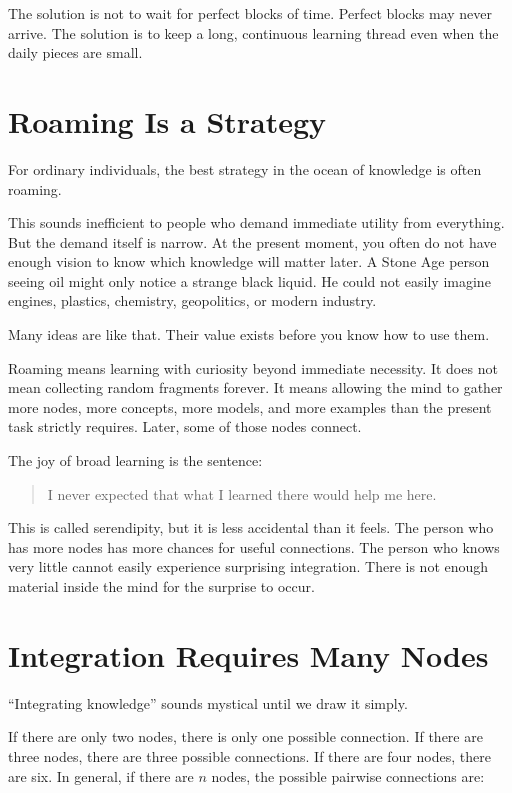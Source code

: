 The solution is not to wait for perfect blocks of time. Perfect blocks may never arrive. The solution is to keep a long, continuous learning thread even when the daily pieces are small.

\section*{Roaming Is a Strategy}

For ordinary individuals, the best strategy in the ocean of knowledge is often roaming.

This sounds inefficient to people who demand immediate utility from everything. But the demand itself is narrow. At the present moment, you often do not have enough vision to know which knowledge will matter later. A Stone Age person seeing oil might only notice a strange black liquid. He could not easily imagine engines, plastics, chemistry, geopolitics, or modern industry.

Many ideas are like that. Their value exists before you know how to use them.

Roaming means learning with curiosity beyond immediate necessity. It does not mean collecting random fragments forever. It means allowing the mind to gather more nodes, more concepts, more models, and more examples than the present task strictly requires. Later, some of those nodes connect.

The joy of broad learning is the sentence:

\begin{quote}
I never expected that what I learned there would help me here.
\end{quote}

This is called serendipity, but it is less accidental than it feels. The person who has more nodes has more chances for useful connections. The person who knows very little cannot easily experience surprising integration. There is not enough material inside the mind for the surprise to occur.

\section*{Integration Requires Many Nodes}

``Integrating knowledge'' sounds mystical until we draw it simply.

If there are only two nodes, there is only one possible connection. If there are three nodes, there are three possible connections. If there are four nodes, there are six. In general, if there are \(n\) nodes, the possible pairwise connections are:

